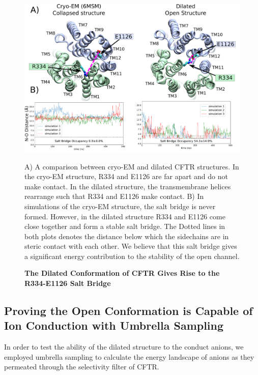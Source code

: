 \begin{figure}
	\begin{center}
		\includegraphics[width=1\textwidth]{figures/opening/salt_bridge_E1126_R334_figure.pdf}
	\end{center}
	\captionsetup{singlelinecheck = false, justification=raggedright}
	\caption[The Dilated Conformation of CFTR Gives Rise to the R334-E1126 Salt Bridge] {\textbf{The Dilated Conformation of CFTR Gives Rise to the R334-E1126 Salt Bridge}}{A) A comparison between cryo-EM and dilated CFTR structures. In the cryo-EM structure, R334 and E1126 are far apart and do not make contact. In the dilated structure, the transmembrane helices rearrange such that R334 and E1126 make contact. B) In simulations of the cryo-EM structure, the salt bridge is never formed. However, in the dilated structure R334 and E1126 come close together and form a stable salt bridge. The Dotted lines  in both plots denotes the distance below which the sidechains are in steric contact with each other. We believe that this salt bridge gives a significant energy contribution to the stability of the open channel. }
	\label{salt_bridge_fig}
\end{figure}

\subsection{Proving the Open Conformation is Capable of Ion Conduction with Umbrella Sampling}

In order to test the ability of the dilated structure to the conduct anions, we employed umbrella sampling to calculate the energy landscape of anions as they permeated through the selectivity filter of CFTR. 

